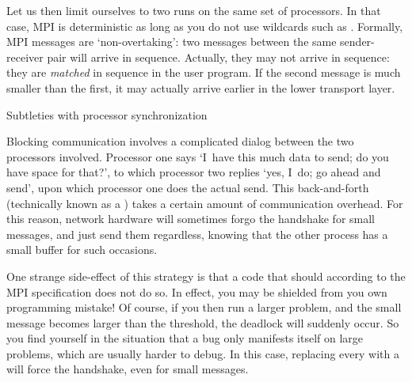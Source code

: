 Let us then limit ourselves to two runs on the same set of processors. 
In that case, MPI is deterministic as long as you do not use 
wildcards such as . Formally, 
MPI messages are `non-overtaking': two messages between the same
sender-receiver pair will arrive in sequence.
Actually, they may not arrive in sequence: they are \emph{matched}
in sequence in the user program. If the second message is much smaller than the first,
it may actually arrive earlier in the lower transport layer.


 {Subtleties with processor synchronization}
\label{sec:handshake}

Blocking communication involves a complicated dialog between the two
processors involved. Processor one says `I~have this much data to
send; do you have space for that?', to which processor two replies
`yes, I~do; go ahead and send', upon which processor one does the
actual send. This back-and-forth (technically known as
a ) takes a certain amount of communication
overhead. For this reason, network hardware will sometimes forgo the
handshake for small messages, and just send them regardless, knowing
that the other process has a small buffer for such occasions.


One strange side-effect of this strategy is that a code that
should  according to the MPI specification does
not do so. In effect, you may be shielded from you own programming
mistake! Of course, if you then run a larger problem, and the small
message becomes larger than the threshold, the deadlock will suddenly
occur. So you find yourself in the situation that a bug only manifests
itself on large problems, which are usually harder to debug.
In this case,
replacing every  with a 
will force the handshake, even for small messages.

